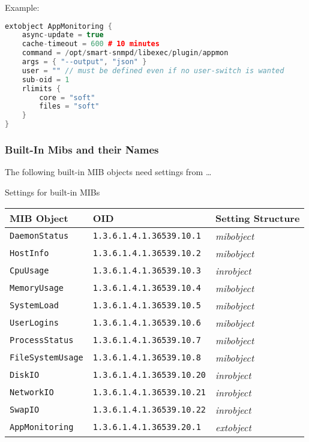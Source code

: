 \begin{minipage}{\textwidth}
Example:
\begin{lstlisting}[language=C++,inputencoding=latin9,frame=shadowbox]
extobject AppMonitoring {
    async-update = true
    cache-timeout = 600 # 10 minutes
    command = /opt/smart-snmpd/libexec/plugin/appmon
    args = { "--output", "json" }
    user = "" // must be defined even if no user-switch is wanted
    sub-oid = 1
    rlimits {
        core = "soft"
        files = "soft"
    }
}\end{lstlisting}
\end{minipage}

\begin{minipage}{\textwidth}
\subsubsection{Built-In Mibs and their Names}

The following built-in MIB objects need settings from \ldots

\begin{threeparttable}
\caption{Settings for built-in MIBs}
\begin{tabular}{@{}*{3}{l}@{}}
\hline
\textbf{MIB Object} & \textbf{OID} & \textbf{Setting Structure}\\
\hline
\texttt{DaemonStatus} & \texttt{1.3.6.1.4.1.36539.10.1} & \emph{mibobject}\\
\texttt{HostInfo} & \texttt{1.3.6.1.4.1.36539.10.2} & \emph{mibobject}\\
\texttt{CpuUsage} & \texttt{1.3.6.1.4.1.36539.10.3} & \emph{inrobject}\\
\texttt{MemoryUsage} & \texttt{1.3.6.1.4.1.36539.10.4} & \emph{mibobject}\\
\texttt{SystemLoad} & \texttt{1.3.6.1.4.1.36539.10.5} & \emph{mibobject}\\
\texttt{UserLogins} & \texttt{1.3.6.1.4.1.36539.10.6} & \emph{mibobject}\\
\texttt{ProcessStatus} & \texttt{1.3.6.1.4.1.36539.10.7} & \emph{mibobject}\\
\texttt{FileSystemUsage} & \texttt{1.3.6.1.4.1.36539.10.8} & \emph{mibobject}\\
\texttt{DiskIO} & \texttt{1.3.6.1.4.1.36539.10.20} & \emph{inrobject}\\
\texttt{NetworkIO} & \texttt{1.3.6.1.4.1.36539.10.21} & \emph{inrobject}\\
\texttt{SwapIO} & \texttt{1.3.6.1.4.1.36539.10.22} & \emph{inrobject}\\
\texttt{AppMonitoring} & \texttt{1.3.6.1.4.1.36539.20.1} & \emph{extobject}\\
\hline
\end{tabular}
\end{threeparttable}
\end{minipage}

